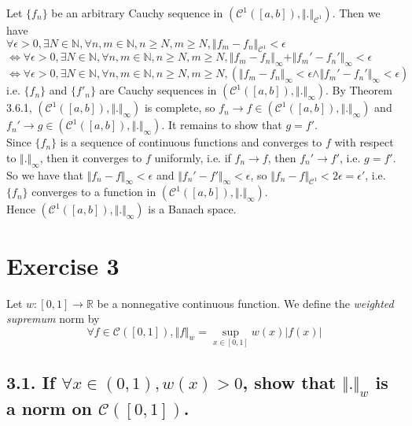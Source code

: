 \documentclass[12pt,a4paper]{article}
\newcommand{\N}{\mathbb{N}}
\newcommand{\R}{\mathbb{R}}
\theoremstyle{plain}
\theoremstyle{remark}
\theoremstyle{definition}
\begin{document}
Let $\{f_n\}$ be an arbitrary Cauchy sequence in $(\mathcal{C}^1([a,b]),\Vert . \Vert_{\mathcal{C}^1})$. Then we have \\
$\forall \epsilon > 0, \exists N \in \N, \forall n,m \in \N, n\ge N, m\ge N, \Vert f_m - f_n \Vert_{\mathcal{C}^1} < \epsilon$\\
$\Leftrightarrow \forall \epsilon > 0, \exists N \in \N, \forall n,m \in \N, n\ge N, m\ge N, \Vert f_m - f_n \Vert_{\infty} + \Vert f_m' - f_n' \Vert_{\infty} < \epsilon$\\
$\Leftrightarrow \forall \epsilon > 0, \exists N \in \N, \forall n,m \in \N, n\ge N, m\ge N, \left(\Vert f_m - f_n \Vert_{\infty} < \epsilon \land \Vert f_m' - f_n' \Vert_{\infty} < \epsilon\right)$\\
i.e. $\{f_n\}$ and $\{f'_n\}$ are Cauchy sequences in $(\mathcal{C}^1([a,b]),\Vert . \Vert_{\infty})$. By Theorem 3.6.1, $(\mathcal{C}^1([a,b]), \Vert . \Vert_{\infty})$ is complete, so $f_n \to f \in (\mathcal{C}^1([a,b]), \Vert . \Vert_{\infty})$ and $f_n' \to g \in (\mathcal{C}^1([a,b]), \Vert . \Vert_{\infty})$. It remains to show that $g = f'$.\\
Since $\{f_n\}$ is a sequence of continuous functions and converges to $f$ with respect to $\Vert . \Vert_{\infty}$, then it converges to $f$ uniformly, i.e. if $f_n \to f$, then $f_n' \to f'$, i.e. $g = f'$.\\
So we have that $\Vert f_n - f \Vert_{\infty}<\epsilon$ and $\Vert f_n' - f' \Vert_{\infty} < \epsilon$, so $\Vert f_n - f \Vert_{\mathcal{C}^1} < 2\epsilon = \epsilon'$, i.e. $\{f_n\}$ converges to a function in $(\mathcal{C}^1([a,b]), \Vert . \Vert_{\infty})$.\\
Hence $(\mathcal{C}^1([a,b]), \Vert . \Vert_{\infty})$ is a Banach space.

\pagebreak
\section*{Exercise 3}
Let $w:[0,1]\to \R$ be a nonnegative continuous function. We define the \emph{weighted supremum} norm by 
$$\forall f \in \mathcal{C}([0,1]), \Vert f \Vert_w = \sup\limits_{x \in [0,1]} w(x)\vert f(x) \vert$$

\subsection*{3.1. If $\forall x \in (0,1), w(x) > 0$, show that $\Vert.\Vert_w$ is a norm on $\mathcal{C}([0,1])$.}
\end{document}

